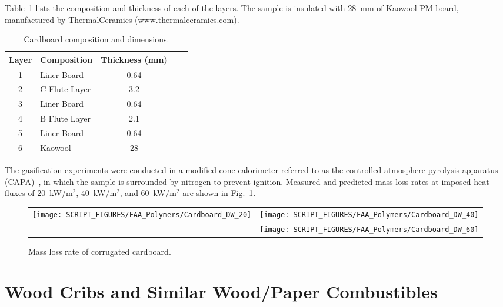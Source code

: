 \noindent Table~\ref{Dimensions_Cardboard} lists the composition and thickness of each of the layers. The sample is insulated with 28~mm of Kaowool PM board, manufactured by ThermalCeramics (www.thermalceramics.com).
\begin{table}[h!]
\caption[Cardboard composition and dimensions]{Cardboard composition and dimensions.}
\begin{center}
\begin{tabular}{|c|l|c|l|l|}
\hline
Layer     & Composition   & Thickness (mm) \\ \hline \hline
1         & Liner Board     & 0.64       \\ \hline
2         & C Flute Layer & 3.2        \\ \hline
3         & Liner Board     & 0.64       \\ \hline
4         & B Flute Layer & 2.1        \\ \hline
5         & Liner Board     & 0.64       \\ \hline
6         & Kaowool         & 28         \\ \hline
\end{tabular}
\end{center}
\label{Dimensions_Cardboard}
\end{table}
The gasification experiments were conducted in a modified cone calorimeter referred to as the controlled atmosphere pyrolysis apparatus (CAPA)~\cite{Semmes:IAFSS11}, in which the sample is surrounded by nitrogen to prevent ignition. Measured and predicted mass loss rates at imposed heat fluxes of 20~kW/m$^2$, 40~kW/m$^2$, and 60~kW/m$^2$ are shown in Fig.~\ref{MLR_Cardboard}.

\begin{figure}[h!]
\begin{tabular*}{\textwidth}{l@{\extracolsep{\fill}}r}
\texttt{[image: SCRIPT\_FIGURES/FAA\_Polymers/Cardboard\_DW\_20]} &
\texttt{[image: SCRIPT\_FIGURES/FAA\_Polymers/Cardboard\_DW\_40]} \\
 & \texttt{[image: SCRIPT\_FIGURES/FAA\_Polymers/Cardboard\_DW\_60]}
\end{tabular*}
\caption[Mass loss rate of corrugated cardboard]{Mass loss rate of corrugated cardboard.}
\label{MLR_Cardboard}
\end{figure}


\clearpage

\section{Wood Cribs and Similar Wood/Paper Combustibles}

